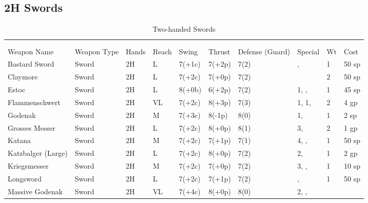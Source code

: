 \documentclass[oneside,11pt,english]{book}
\begin{document}
\subsection{2H Swords}\vspace{-15pt}
\begin{longtabu} to 1\linewidth {X[2,l]XX[-1,c]X[-1,c]XXX[-1,c]X[2,l]X[-3,c]X[-3,r]}
	\captionsetup{labelformat=blank,textformat=empty}
	\caption{Two-handed Swords}\vspace{-15pt}\\
	\label{tab:2H Swords}\\\endfirsthead
Weapon Name					&Weapon Type	&Hands	&Reach	&Swing	&Thrust	&Defense (Guard)	&Special						&Wt		&Cost\\\toprule\endhead
Bastard Sword				&Sword			&2H		&L		&7(+1c)	&7(+2p)	&7(2)				&,  			&1		&50 sp\\
Claymore					&Sword			&2H		&L		&7(+2c)	&7(+0p)	&7(2)	& &2 &50 sp\\
Estoc						&Sword 			&2H		&L		&8(+0b)	&6(+2p)	&7(2)	& 1, , 			&1		&45 sp\\
Flammenschwert				&Sword			&2H		&VL		&7(+2c)	&8(+3p)	&7(3)	& 1,  1, 				&2		&4 gp\\
Godenak &Sword &2H &M &7(+3c) &8(-1p) &8(0) & 1,  &1 &2 sp\\
Grosses Messer &Sword &2H &L &7(+2c) &8(+0p) &8(1) & 3,  &2 &1 gp\\
Katana 					&Sword &2H &M 	&7(+2c) &7(+1p) &7(1) & 4, ,  			&1 	&50 sp\\
Katzbalger (Large) 		&Sword &2H &L 	&7(+2c) &8(+0p) &7(2) & 2,  				&1 	&2 gp \\
Kriegsmesser 			&Sword &2H &M 	&7(+2c) &7(+0p) &7(2) & 3, ,  			&1 	&10 sp\\
Longsword 				&Sword &2H &L 	&7(+2c) &7(+1p) &7(2) &,  					&1 	&50 sp\\
Massive Godenak 		&Sword &2H &VL	&7(+4c) &8(+0p) &8(0) & 2, , 	&	&\\    

\end{longtabu}
\end{document}
